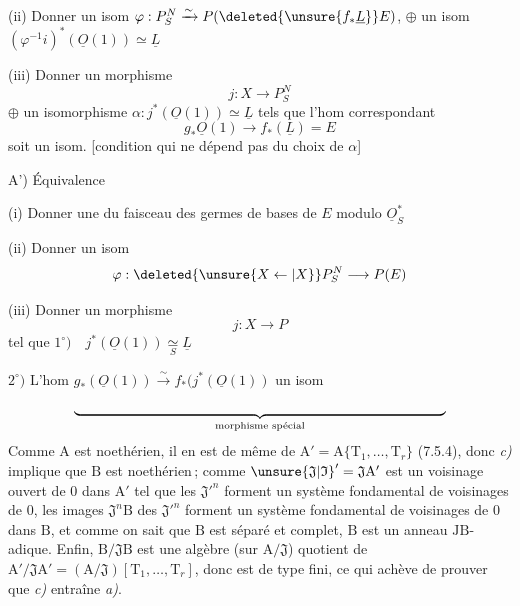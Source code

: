 (ii) Donner un isom $\varphi:P_{S}^{N}\xrightarrow{\sim}P(\deleted{\unsure{f_{*}\underline{L}}}E)$, $\oplus$ un isom $(\varphi^{-1}i)^{*}(\underline{O}(1))\simeq\underline{L}$

(iii) Donner un  morphisme
\[
j:X\longrightarrow P_{S}^{N}
\]
$\oplus$ un isomorphisme $\alpha:j^{*}(\underline{O}(1))\simeq\underline{L}$
tels que l'hom correspondant
\[
g_{*}\underline{O}(1)\longrightarrow f_{*}(\underline{L})=E
\]
soit un isom. [condition qui ne dépend pas du choix de $\alpha$]

A') Équivalence

(i) Donner une   du faisceau des germes de bases de $E$ modulo $\underline{O}_{S}^{*}$

(ii) Donner un isom
\[
\varphi:\deleted{\unsure{X\leftarrow|X}}P_{S}^{N}\longrightarrow P(E)
\]

(iii) Donner un morphisme
\[
j:X\longrightarrow P
\]
tel que \quad $1^{\circ})\quad j^{*}(\underline{O}(1))\underset{S}{\simeq}\underline{L}$ 

$2^{\circ})$ \quad L'hom $g_{*}(\underline{O}(1))\xrightarrow{\sim}f_{*}(j^{*}(\underline{O}(1))$ un isom
\[
\underbrace{\hspace{.77\linewidth}}_{\text{morphisme spécial}}
\]
Comme $\mathrm{A}$ est noethérien, il en est de même de $\mathrm{A}'=\mathrm{A}\{\mathrm{T}_1,\ldots,\mathrm{T}_r\}$ (7.5.4), donc \textit{c)} implique que $\mathrm{B}$ est noethérien\,; comme $\unsure{\mathfrak{J}|\mathfrak{I}}'=\mathfrak{J}\mathrm{A}'$ est un voisinage ouvert de $0$ dans $\mathrm{A}'$ tel que les ${\mathfrak{J}'}^{n}$ forment un système fondamental de voisinages de $0$, les images $\mathfrak{J}^{n}\mathrm{B}$ des ${\mathfrak{J}'}^{n}$ forment un système fondamental de voisinages de $0$ dans $\mathrm{B}$, et comme on sait que $\mathrm{B}$ est séparé et complet, $\mathrm{B}$ est un anneau $\mathrm{J}\mathrm{B}$-adique. Enfin, $\mathrm{B}/\mathfrak{J}\mathrm{B}$ est une algèbre (sur $\mathrm{A}/\mathfrak{J}$) quotient de $\mathrm{A}'/\mathfrak{J}\mathrm{A}'=(\mathrm{A}/\mathfrak{J})[\mathrm{T}_1,\ldots,\mathrm{T}_r]$, donc est de type fini, ce qui achève de prouver que \textit{c)} entraîne \textit{a)}.

